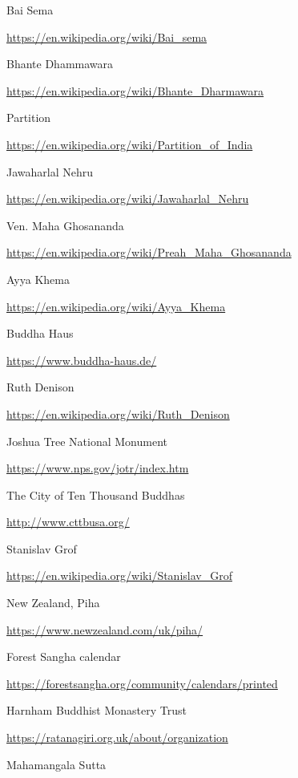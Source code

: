 \begin{thebibliography}{9}
 Bai Sema

  {\urlsize \url{https://en.wikipedia.org/wiki/Bai_sema}}

 Bhante Dhammawara

  {\urlsize \url{https://en.wikipedia.org/wiki/Bhante_Dharmawara}}

 Partition

  {\urlsize \url{https://en.wikipedia.org/wiki/Partition_of_India}}

 Jawaharlal Nehru

  {\urlsize \url{https://en.wikipedia.org/wiki/Jawaharlal_Nehru}}

 Ven. Maha Ghosananda

  {\urlsize \url{https://en.wikipedia.org/wiki/Preah_Maha_Ghosananda}}

 Ayya Khema

  {\urlsize \url{https://en.wikipedia.org/wiki/Ayya_Khema}}

 Buddha Haus

  {\urlsize \url{https://www.buddha-haus.de/}}

 Ruth Denison

  {\urlsize \url{https://en.wikipedia.org/wiki/Ruth_Denison}}

 Joshua Tree National Monument

  {\urlsize \url{https://www.nps.gov/jotr/index.htm}}

 The City of Ten Thousand Buddhas

  {\urlsize \url{http://www.cttbusa.org/}}

 Stanislav Grof

  {\urlsize \url{https://en.wikipedia.org/wiki/Stanislav_Grof}}

 New Zealand, Piha

  {\urlsize \url{https://www.newzealand.com/uk/piha/}}

 Forest Sangha calendar

  {\urlsize \url{https://forestsangha.org/community/calendars/printed}}

 Harnham Buddhist Monastery Trust

  {\urlsize \url{https://ratanagiri.org.uk/about/organization}}

 Mahamangala Sutta


\end{thebibliography}
